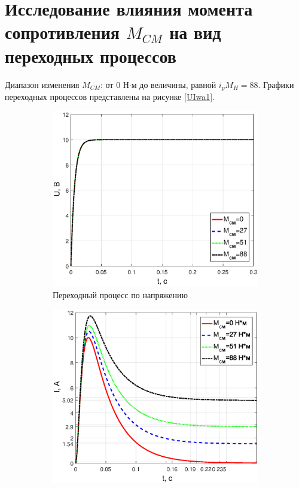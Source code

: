 \documentclass[12pt,a4paper]{article}
\begin{document}
\newpage
\section{Исследование влияния момента сопротивления $M_{CM}$ на вид переходных процессов}
Диапазон изменения $M_{CM}$: от 0 Н$\cdot$м до величины, равной $i_pM_H=88$. Графики переходных процессов представлены на рисунке \ref{UIwa1}.
\begin{figure}[H]
	\centering
	\begin{subfigure}[b]{0.48\textwidth}
	    \includegraphics[width = \textwidth]{U1}
		\caption{Переходный процесс по напряжению}
	\end{subfigure}
	\hfill
	\begin{subfigure}[b]{0.48\textwidth}
		\includegraphics[width = \textwidth]{I1}

\end{subfigure}
\end{figure}
\end{document}
